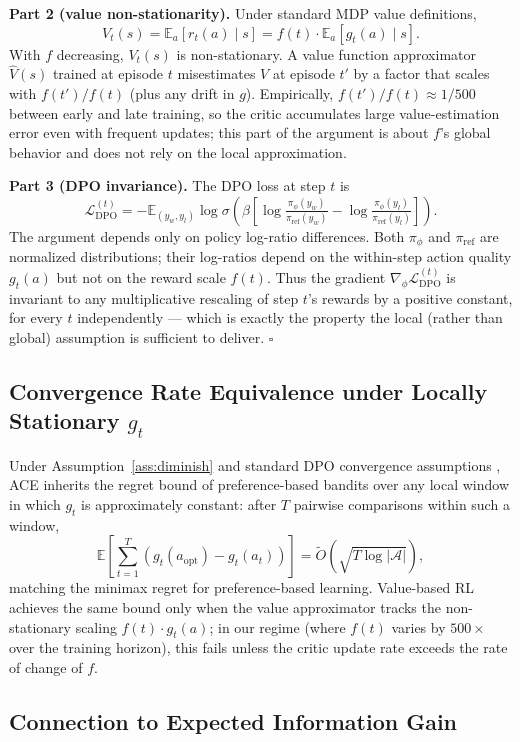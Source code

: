 \documentclass[twoside]{article}
\theoremstyle{plain}
\theoremstyle{definition}
\theoremstyle{remark}
\begin{document}
\textbf{Part 2 (value non-stationarity).} Under standard MDP value definitions,
\[V_t(s) = \mathbb{E}_a[r_t(a) \mid s] = f(t) \cdot \mathbb{E}_a[g_t(a) \mid s].\]
With $f$ decreasing, $V_t(s)$ is non-stationary. A value function approximator $\hat{V}(s)$ trained at episode $t$ misestimates $V$ at episode $t'$ by a factor that scales with $f(t')/f(t)$ (plus any drift in $g$). Empirically, $f(t')/f(t) \approx 1/500$ between early and late training, so the critic accumulates large value-estimation error even with frequent updates; this part of the argument is about $f$'s global behavior and does not rely on the local approximation.

\textbf{Part 3 (DPO invariance).} The DPO loss at step $t$ is
\[\mathcal{L}_\text{DPO}^{(t)} = -\mathbb{E}_{(y_w, y_l)} \log \sigma\!\left(\beta \left[\log\tfrac{\pi_\phi(y_w)}{\pi_\text{ref}(y_w)} - \log\tfrac{\pi_\phi(y_l)}{\pi_\text{ref}(y_l)}\right]\right).\]
The argument depends only on policy log-ratio differences. Both $\pi_\phi$ and $\pi_\text{ref}$ are normalized distributions; their log-ratios depend on the within-step action quality $g_t(a)$ but not on the reward scale $f(t)$. Thus the gradient $\nabla_\phi \mathcal{L}_\text{DPO}^{(t)}$ is invariant to any multiplicative rescaling of step $t$'s rewards by a positive constant, for every $t$ independently --- which is exactly the property the local (rather than global) assumption is sufficient to deliver. \hfill$\square$

\subsection{Convergence Rate Equivalence under Locally Stationary $g_t$}
\label{app:convergence}

Under Assumption~\ref{ass:diminish} and standard DPO convergence assumptions \citep{rafailov2023direct}, ACE inherits the regret bound of preference-based bandits over any local window in which $g_t$ is approximately constant: after $T$ pairwise comparisons within such a window,
\[\mathbb{E}\!\left[\sum_{t=1}^T (g_t(a_\text{opt}) - g_t(a_t))\right] = \tilde{O}(\sqrt{T \log |\mathcal{A}|}),\]
matching the minimax regret for preference-based learning. Value-based RL achieves the same bound only when the value approximator tracks the non-stationary scaling $f(t) \cdot g_t(a)$; in our regime (where $f(t)$ varies by $500\times$ over the training horizon), this fails unless the critic update rate exceeds the rate of change of $f$.

\subsection{Connection to Expected Information Gain}
\label{app:info-gain}
\end{document}
